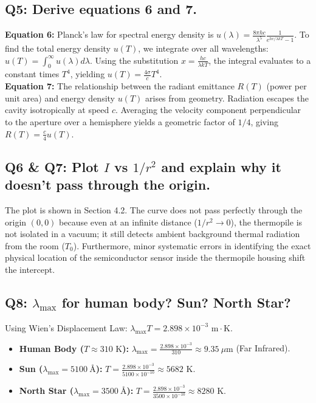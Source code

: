\documentclass[a4paper,11pt]{article}
\begin{document}
\subsection*{Q5: Derive equations 6 and 7.}
\textbf{Equation 6:} Planck's law for spectral energy density is $u(\lambda) = \frac{8\pi hc}{\lambda^5} \frac{1}{e^{hc/\lambda kT} - 1}$. To find the total energy density $u(T)$, we integrate over all wavelengths:
$u(T) = \int_0^\infty u(\lambda) d\lambda$. Using the substitution $x = \frac{hc}{\lambda kT}$, the integral evaluates to a constant times $T^4$, yielding $u(T) = \frac{4\sigma}{c} T^4$. \\
\textbf{Equation 7:} The relationship between the radiant emittance $R(T)$ (power per unit area) and energy density $u(T)$ arises from geometry. Radiation escapes the cavity isotropically at speed $c$. Averaging the velocity component perpendicular to the aperture over a hemisphere yields a geometric factor of $1/4$, giving $R(T) = \frac{c}{4} u(T)$.

\subsection*{Q6 \& Q7: Plot $I$ vs $1/r^2$ and explain why it doesn't pass through the origin.}
The plot is shown in Section 4.2. The curve does not pass perfectly through the origin $(0,0)$ because even at an infinite distance ($1/r^2 \to 0$), the thermopile is not isolated in a vacuum; it still detects ambient background thermal radiation from the room ($T_0$). Furthermore, minor systematic errors in identifying the exact physical location of the semiconductor sensor inside the thermopile housing shift the intercept.

\subsection*{Q8: $\lambda_{\max}$ for human body? Sun? North Star?}
Using Wien's Displacement Law: $\lambda_{\max} T = 2.898 \times 10^{-3} \text{ m}\cdot\text{K}$.
\begin{itemize}
    \item \textbf{Human Body ($T \approx 310\text{ K}$):} $\lambda_{\max} = \frac{2.898 \times 10^{-3}}{310} \approx 9.35\ \mu\text{m}$ (Far Infrared).
    \item \textbf{Sun ($\lambda_{\max} = 5100\ \text{\AA}$):} $T = \frac{2.898 \times 10^{-3}}{5100 \times 10^{-10}} \approx 5682\text{ K}$.
    \item \textbf{North Star ($\lambda_{\max} = 3500\ \text{\AA}$):} $T = \frac{2.898 \times 10^{-3}}{3500 \times 10^{-10}} \approx 8280\text{ K}$.
\end{itemize}
\end{document}
